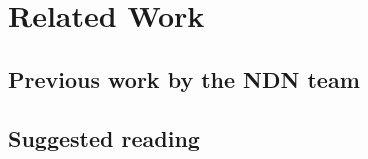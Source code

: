 \section{Related Work}

\subsection{Previous work by the NDN team}


\subsection{Suggested reading}

